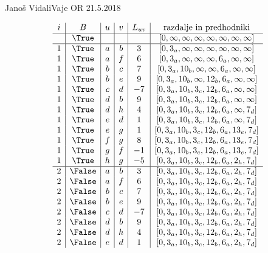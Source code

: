 \begin{naloga}{Janoš Vidali}{Vaje OR 21.5.2018}
\begin{odgovor}
\begin{tabela}
$$
\begin{array}{c|c|c|c|c|c}
i & B & u & v & L_{uv} & \text{razdalje in predhodniki} \\ \hline
  & \True  &   &   &    & [0, \infty, \infty, \infty, \infty, \infty, \infty, \infty] \\ \hline
1 & \True  & a & b &  3 & [0, 3_a, \infty, \infty, \infty, \infty, \infty, \infty] \\
1 & \True  & a & f &  6 & [0, 3_a, \infty, \infty, \infty, 6_a, \infty, \infty] \\
1 & \True  & b & c &  7 & [0, 3_a, 10_b, \infty, \infty, 6_a, \infty, \infty] \\
1 & \True  & b & e &  9 & [0, 3_a, 10_b, \infty, 12_b, 6_a, \infty, \infty] \\
1 & \True  & c & d & -7 & [0, 3_a, 10_b, 3_c, 12_b, 6_a, \infty, \infty] \\
1 & \True  & d & b &  9 & [0, 3_a, 10_b, 3_c, 12_b, 6_a, \infty, \infty] \\
1 & \True  & d & h &  4 & [0, 3_a, 10_b, 3_c, 12_b, 6_a, \infty, 7_d] \\
1 & \True  & e & d &  1 & [0, 3_a, 10_b, 3_c, 12_b, 6_a, \infty, 7_d] \\
1 & \True  & e & g &  1 & [0, 3_a, 10_b, 3_c, 12_b, 6_a, 13_e, 7_d] \\
1 & \True  & f & g &  8 & [0, 3_a, 10_b, 3_c, 12_b, 6_a, 13_e, 7_d] \\
1 & \True  & g & f & -1 & [0, 3_a, 10_b, 3_c, 12_b, 6_a, 13_e, 7_d] \\
1 & \True  & h & g & -5 & [0, 3_a, 10_b, 3_c, 12_b, 6_a, 2_h, 7_d] \\ \hline
2 & \False & a & b &  3 & [0, 3_a, 10_b, 3_c, 12_b, 6_a, 2_h, 7_d] \\
2 & \False & a & f &  6 & [0, 3_a, 10_b, 3_c, 12_b, 6_a, 2_h, 7_d] \\
2 & \False & b & c &  7 & [0, 3_a, 10_b, 3_c, 12_b, 6_a, 2_h, 7_d] \\
2 & \False & b & e &  9 & [0, 3_a, 10_b, 3_c, 12_b, 6_a, 2_h, 7_d] \\
2 & \False & c & d & -7 & [0, 3_a, 10_b, 3_c, 12_b, 6_a, 2_h, 7_d] \\
2 & \False & d & b &  9 & [0, 3_a, 10_b, 3_c, 12_b, 6_a, 2_h, 7_d] \\
2 & \False & d & h &  4 & [0, 3_a, 10_b, 3_c, 12_b, 6_a, 2_h, 7_d] \\
2 & \False & e & d &  1 & [0, 3_a, 10_b, 3_c, 12_b, 6_a, 2_h, 7_d] \\

\end{array}$$
\end{tabela}
\end{odgovor}
\end{naloga}
